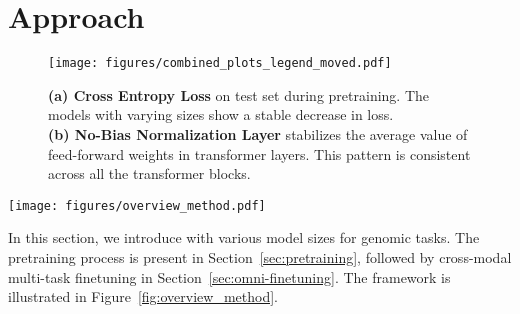 \section{Approach}
\begin{figure}[t!]
    \centering
    \texttt{[image: figures/combined\_plots\_legend\_moved.pdf]}
    \vspace{-2em} %
    \caption{\textbf{(a) Cross Entropy Loss} on test set during pretraining. The models with varying sizes show a stable decrease in loss. \\
    \textbf{(b) No-Bias Normalization Layer} stabilizes the average value of feed-forward weights in transformer layers. This pattern is consistent across all the transformer blocks.}
     \vspace{-1em}
    \label{fig:no-bais-norm}
\end{figure}
 \begin{figure*}[ht!]
    \centering
    \texttt{[image: figures/overview\_method.pdf]}
    \vspace{-2em} %
    \caption{\textbf{Overview of of Omni-DNA architecture.} In  \textbf{pretraining}, \method are trained on DNA only with next-token prediction. \textbf{Multi-task finetuning} enables the model to perform diverse tasks including classification, function prediction, and DNA-to-image.}
    \label{fig:overview_method}
  \vspace{-1em}
\end{figure*}

In this section, we introduce \method with various model sizes for genomic tasks. The pretraining process is present in Section~\ref{sec:pretraining}, followed by cross-modal multi-task finetuning in Section~\ref{sec:omni-finetuning}. The framework is illustrated in Figure~\ref{fig:overview_method}.

 


